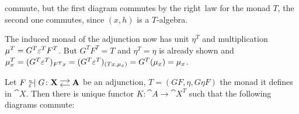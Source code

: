 \begin{beweis}
\begin{itemize1}
\begin{figure}[H]
\centering
\begin{subfigure}{0.4\textwidth}
\centering
\end{subfigure}
\hspace{2em}
\begin{subfigure}{0.4\textwidth}
\centering
\end{subfigure}
\end{figure}
commute, but the first diagram commutes by the right~ law for the monad $T$, the
second one commutes, since $(x,h)$ is a $T$-algebra.
\item The induced monad of the adjunction now has unit $\eta^T$ and multiplication
$\mu^T = G^T \varepsilon^T F^T$. But $G^TF^T = T$ and $\eta^T = \eta$ is already shown and
$\mu^T_x = (G^T\varepsilon^{T})_{F^Tx} = (G^T\varepsilon^T)_{(Tx,\mu_x)} = G^T(\mu_x) = \mu_x$.
\end{itemize1}
\end{beweis}
\begin{theorem}
    Let $F {\ }_{\eps}^{\text{\tiny{$\eta$}}}\!\!\!\!\adj G \colon \adjar{X}{A}$ be an adjunction,
    $T = (GF,\eta,G\eta F)$ the monad it defines in $\cat{X}$. Then there is unique functor
    $K \colon \cat{A} \to \cat{X^T}$ such that the following diagrams commute:
    \begin{figure}[H]
    \centering
    \begin{subfigure}{0.4\textwidth}
    \centering
    \end{subfigure}
    \hspace{2em}
    \begin{subfigure}{0.4\textwidth}
    \centering
    \end{subfigure}
    \end{figure}
\end{theorem}
